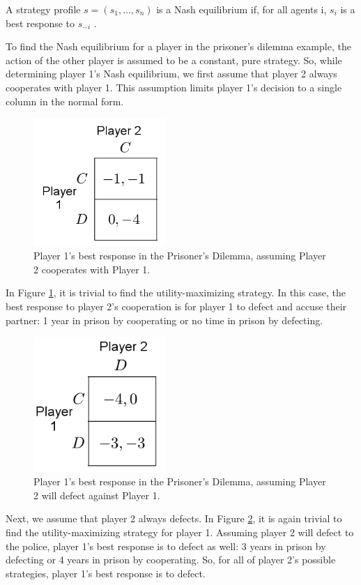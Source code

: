 \begin{define}
  A strategy profile $s=(s_1,\dots ,s_n)$ is a Nash equilibrium if, for all agents i, $s_i$ is a best response to $s_{-i}$ \cite{shoh09}.
\end{define}

To find the Nash equilibrium for a player in the prisoner's dilemma example, the action of the other player is assumed to be a constant, pure strategy. So, while determining player 1's Nash equilibrium, we first assume that player 2 always cooperates with player 1. This assumption limits player 1's decision to a single column in the normal form.
\begin{figure}[H]
  \centering
  \includegraphics[width=5cm]{figures/ExamplePartialCol1.png}
  \caption{Player 1's best response in the Prisoner's Dilemma, assuming Player 2 cooperates with Player 1.}
  \label{fig:NashCol1}
\end{figure}

In Figure \ref{fig:NashCol1}, it is trivial to find the utility-maximizing strategy. In this case, the best response to player 2's cooperation is for player 1 to defect and accuse their partner: 1 year in prison by cooperating or no time in prison by defecting.\\

\begin{figure}[H]
  \centering
  \includegraphics[width=5cm]{figures/ExamplePartialCol2.png}
  \caption{Player 1's best response in the Prisoner's Dilemma, assuming Player 2 will defect against Player 1.}
  \label{fig:NashCol2}
\end{figure}
Next, we assume that player 2 always defects. In Figure \ref{fig:NashCol2}, it is again trivial to find the utility-maximizing strategy for player 1. Assuming player 2 will defect to the police, player 1's best response is to defect as well: 3 years in prison by defecting or 4 years in prison by cooperating. So, for all of player 2's possible strategies, player 1's best response is to defect.\\

